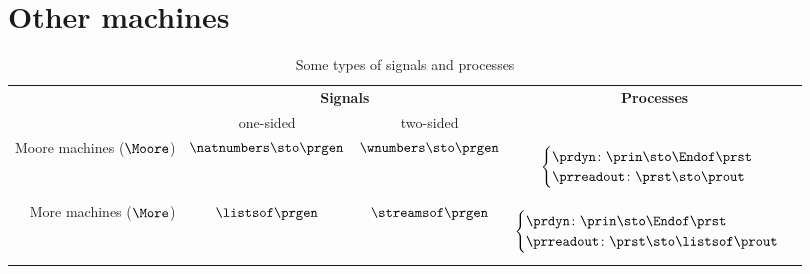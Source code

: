 \section{Other machines}

\begin{table*}[b]
    \caption{Some types of signals and processes}
    \label{tab:processes-types}
    \begin{tabular}{rccc}
                                                     & \multicolumn{2}{c}{\textbf{Signals}}      & \textbf{Processes} \\
                                                     & \rule{0pt}{10pt} one-sided                & two-sided            & \\
        Moore machines ($\Moore$)                    &
        $\natnumbers \sto \prgen$
                                                     &
        $\wnumbers \sto \prgen$
                                                     &
        \begin{minipage}{4cm}
            \raggedright
            \begin{equation*}
                \begin{cases}
                    \prdyn \colon \prin \sto \Endof \prst \\
                    \prreadout \colon \prst \sto \prout
                \end{cases}
            \end{equation*}
        \end{minipage} \\

        More machines ($\More$)                      & $\listsof \prgen$                          & $\streamsof \prgen$
                                                     &
        \begin{minipage}{4cm}
            \raggedright
            \begin{equation*}
                \begin{cases}
                    \prdyn \colon   \prin \sto \Endof \prst \\
                    \prreadout \colon \prst \sto \listsof \prout
                \end{cases}
            \end{equation*}


\end{minipage}
\end{tabular}
\end{table*}
